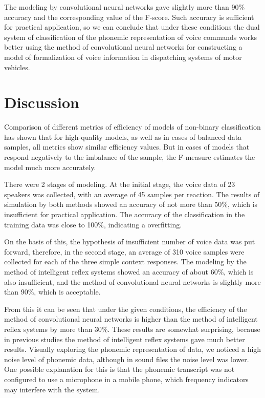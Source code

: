 The modeling by convolutional neural networks gave slightly more than 90\% accuracy and the corresponding value of the F-score. Such accuracy is sufficient for practical application, so we can conclude that under these conditions the dual system of classification of the phonemic representation of voice commands works better using the method of convolutional neural networks for constructing a model of formalization of voice information in dispatching systems of motor vehicles.

\section{Discussion}

Comparison of different metrics of efficiency of models of non-binary classification has shown that for high-quality models, as well as in cases of balanced data samples, all metrics show similar efficiency values. But in cases of models that respond negatively to the imbalance of the sample, the F-measure estimates the model much more accurately.

There were 2 stages of modeling. At the initial stage, the voice data of 23 speakers was collected, with an average of 45 samples per reaction. The results of simulation by both methods showed an accuracy of not more than 50\%, which is insufficient for practical application. The accuracy of the classification in the training data was close to 100\%, indicating a overfitting.

On the basis of this, the hypothesis of insufficient number of voice data was put forward, therefore, in the second stage, an average of 310 voice samples were collected for each of the three simple context responses. The modeling by the method of intelligent reflex systems showed an accuracy of about 60\%, which is also insufficient, and the method of convolutional neural networks is slightly more than 90\%, which is acceptable.

From this it can be seen that under the given conditions, the efficiency of the method of convolutional neural networks is higher than the method of intelligent reflex systems by more than 30\%. These results are somewhat surprising, because in previous studies \cite{eng_Egorchenkov_2016,Teslia_2014,eng_Teslia_2013} the method of intelligent reflex systems gave much better results. Visually exploring the phonemic representation of data, we noticed a high noise level of phonemic data, although in sound files the noise level was lower. One possible explanation for this is that the phonemic transcript was not configured to use a microphone in a mobile phone, which frequency indicators may interfere with the system.

